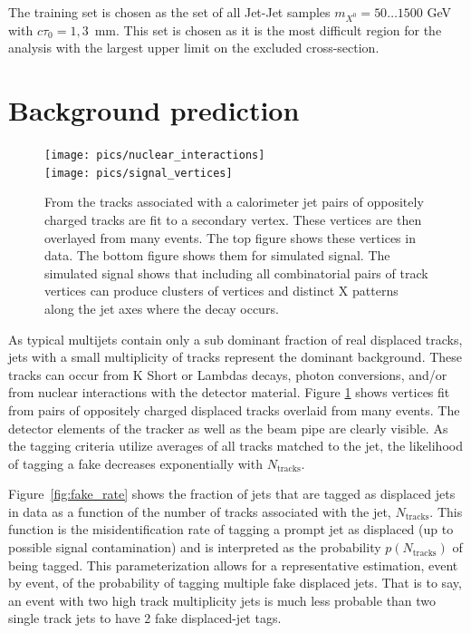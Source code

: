 The training set is chosen as the set of all Jet-Jet samples $m_{X^0}=50\ldots 1500$ GeV with $c\tau_0=1,3$~mm. 
This set is chosen as it is the most difficult region for the analysis with the largest upper limit on the excluded cross-section.


\section{Background prediction}
\label{sec:bkg}

\begin{figure}
\begin{center}
\texttt{[image: pics/nuclear\_interactions]}\\
\texttt{[image: pics/signal\_vertices]}
\caption{From the tracks associated with a calorimeter jet pairs of oppositely charged tracks are fit to a secondary vertex. These vertices are then overlayed from
many events. The top figure shows these vertices in data. The bottom figure shows them for simulated signal. The simulated signal shows that including all combinatorial
pairs of track vertices can produce clusters of vertices and distinct X patterns along the jet axes where the decay occurs. \label{fig:nuclear}}
\end{center}
\end{figure}

As typical multijets contain only a sub dominant fraction of real displaced tracks,
jets with a small multiplicity of tracks represent the dominant background. These tracks can occur from K Short or Lambdas decays, photon conversions, and/or 
from nuclear interactions with the detector material. Figure \ref{fig:nuclear} shows vertices fit from pairs of oppositely charged
displaced tracks overlaid from many events. The detector elements of the tracker as well as the beam pipe are clearly visible. 
As the tagging criteria utilize averages of all tracks matched to the jet, the likelihood of tagging a fake decreases exponentially with $N_\textrm{tracks}$. 

 Figure~\ref{fig:fake_rate} shows the fraction of jets that are tagged as displaced 
jets in data as a function of the number of tracks associated with the jet, $N_\textrm{tracks}$.  
 This function is the misidentification rate of tagging a prompt jet as displaced (up to possible
 signal contamination)  and is interpreted as the probability  $p(N_\text{tracks})$ of being tagged. This
 parameterization allows for a representative estimation, event by event, of the probability of
 tagging multiple fake displaced jets. That is to say, an event with two high track multiplicity jets is much
 less probable than two single track jets to have 2 fake displaced-jet tags. 

